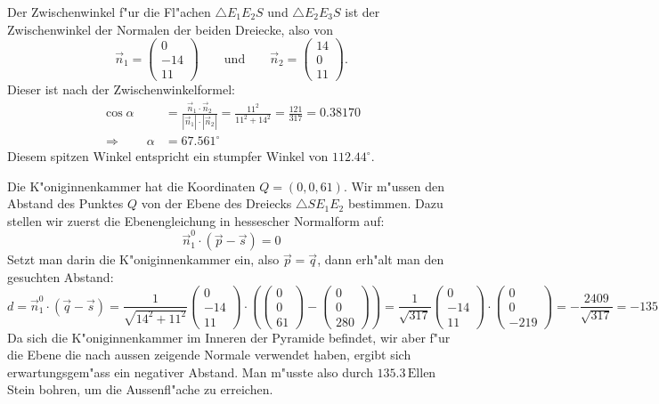 \begin{loesung}
\begin{teilaufgaben}
\item
Der Zwischenwinkel f"ur die Fl"achen $\triangle E_1E_2S$ und
$\triangle E_2E_3S$ ist der Zwischenwinkel der Normalen der beiden
Dreiecke, also von
\[
\vec n_1
=
\begin{pmatrix} 0\\-14\\11 \end{pmatrix}
\qquad\text{und}\qquad
\vec n_2
=
\begin{pmatrix} 14\\0\\11 \end{pmatrix}.
\]
Dieser ist nach der Zwischenwinkelformel:
\begin{align*}
\cos\alpha
&=
\frac{\vec n_1\cdot \vec n_2}{|\vec n_1|\cdot|\vec n_2|}
=
\frac{11^2}{11^2+14^2}=\frac{121}{317}=0.38170
\\
\Rightarrow\qquad
\alpha
&=
67.561^\circ
\end{align*}
Diesem spitzen Winkel entspricht ein stumpfer Winkel von $112.44^\circ$.
\item
Die K"oniginnenkammer hat die Koordinaten $Q=(0,0,61)$.
Wir m"ussen den Abstand des Punktes $Q$ von der Ebene des Dreiecks
$\triangle SE_1E_2$ bestimmen.
Dazu stellen wir zuerst die Ebenengleichung in hessescher Normalform
auf:
\[
\vec n_1^0 \cdot (\vec p-\vec s)=0
\]
Setzt man darin die K"oniginnenkammer ein,  also $\vec p=\vec q$, dann
erh"alt man den gesuchten Abstand:
\[
d
=
\vec n_1^0 \cdot (\vec q-\vec s)
=
\frac1{\sqrt{14^2+11^2}}
\begin{pmatrix}0\\-14\\11 \end{pmatrix}
\cdot
\left(
\begin{pmatrix}0\\0\\61\end{pmatrix}
-
\begin{pmatrix}0\\0\\280\end{pmatrix}
\right)
=
\frac1{\sqrt{317}}
\begin{pmatrix}0\\-14\\11 \end{pmatrix}
\cdot
\begin{pmatrix}0\\0\\-219\end{pmatrix}
=
-\frac{2409}{\sqrt{317}}=-135.30
\]
Da sich die K"oniginnenkammer im Inneren der Pyramide befindet, wir aber
f"ur die Ebene die nach aussen zeigende Normale verwendet haben, ergibt
sich erwartungsgem"ass ein negativer Abstand.
Man m"usste also durch $135.3\,\text{Ellen}$ Stein bohren, um die Aussenfl"ache
zu erreichen.
\qedhere
\end{teilaufgaben}
\end{loesung}

